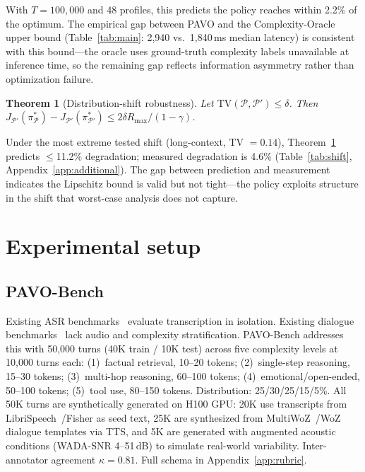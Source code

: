 \documentclass{article}
\newtheorem{theorem}{Theorem}
\begin{document}
With $T=100{,}000$ and 48 profiles, this predicts the policy reaches within 2.2\% of the optimum. The empirical gap between PAVO and the Complexity-Oracle upper bound (Table~\ref{tab:main}: 2{,}940 vs.\ 1{,}840\,ms median latency) is consistent with this bound---the oracle uses ground-truth complexity labels unavailable at inference time, so the remaining gap reflects information asymmetry rather than optimization failure.

\begin{theorem}[Distribution-shift robustness]
\label{thm:robust}
Let $\mathrm{TV}(\mathcal{P},\mathcal{P}')\leq\delta$. Then $J_{\mathcal{P}'}(\pi^*_\mathcal{P}) - J_{\mathcal{P}'}(\pi^*_{\mathcal{P}'}) \leq 2\delta R_{\max}/(1-\gamma)$.
\end{theorem}

Under the most extreme tested shift (long-context, TV $= 0.14$), Theorem~\ref{thm:robust} predicts $\leq$11.2\% degradation; measured degradation is 4.6\% (Table~\ref{tab:shift}, Appendix~\ref{app:additional}). The gap between prediction and measurement indicates the Lipschitz bound is valid but not tight---the policy exploits structure in the shift that worst-case analysis does not capture.

\section{Experimental setup}
\label{sec:exp}

\subsection{PAVO-Bench}
\label{sec:dataset}

Existing ASR benchmarks~\citep{panayotov2015librispeech,ardila2020commonvoice} evaluate transcription in isolation. Existing dialogue benchmarks~\citep{budzianowski2019multiwoz,wen2016woz} lack audio and complexity stratification. PAVO-Bench addresses this with 50{,}000 turns (40K train / 10K test) across five complexity levels at 10{,}000 turns each: (1)~factual retrieval, 10--20 tokens; (2)~single-step reasoning, 15--30 tokens; (3)~multi-hop reasoning, 60--100 tokens; (4)~emotional/open-ended, 50--100 tokens; (5)~tool use, 80--150 tokens. Distribution: 25/30/25/15/5\%. All 50K turns are synthetically generated on H100 GPU: 20K use transcripts from LibriSpeech~\citep{panayotov2015librispeech}/Fisher as seed text, 25K are synthesized from MultiWoZ~\citep{budzianowski2019multiwoz}/WoZ~\citep{wen2016woz} dialogue templates via TTS, and 5K are generated with augmented acoustic conditions (WADA-SNR 4--51\,dB) to simulate real-world variability. Inter-annotator agreement $\kappa=0.81$. Full schema in Appendix~\ref{app:rubric}.
\end{document}
